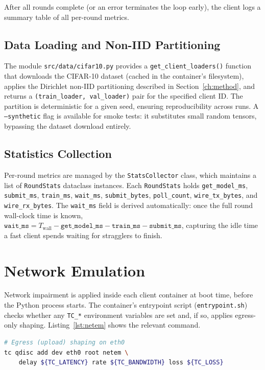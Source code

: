 \documentclass[12pt,a4paper]{report}
\begin{document}
After all rounds complete (or an error terminates the loop early), the
client logs a summary table of all per-round metrics.

\subsection{Data Loading and Non-IID Partitioning}

The module \texttt{src/data/cifar10.py} provides a
\texttt{get\_client\_loaders()} function that downloads the CIFAR-10
dataset (cached in the container's filesystem), applies the Dirichlet
non-IID partitioning described in Section~\ref{ch:method}, and returns a
\texttt{(train\_loader, val\_loader)} pair for the specified client ID.
The partition is deterministic for a given seed, ensuring reproducibility
across runs.  A \texttt{--synthetic} flag is available for smoke tests:
it substitutes small random tensors, bypassing the dataset download
entirely.

\subsection{Statistics Collection}

Per-round metrics are managed by the \texttt{StatsCollector} class,
which maintains a list of \texttt{RoundStats} dataclass instances.
Each \texttt{RoundStats} holds \texttt{get\_model\_ms},
\texttt{submit\_ms}, \texttt{train\_ms}, \texttt{wait\_ms},
\texttt{submit\_bytes}, \texttt{poll\_count}, \texttt{wire\_tx\_bytes},
and \texttt{wire\_rx\_bytes}.  The \texttt{wait\_ms} field is derived
automatically: once the full round wall-clock time is known,
$\texttt{wait\_ms} = T_{\mathrm{wall}} - \texttt{get\_model\_ms} -
\texttt{train\_ms} - \texttt{submit\_ms}$, capturing the idle time a
fast client spends waiting for stragglers to finish.

\section{Network Emulation}
\label{sec:netem}

Network impairment is applied inside each client container at boot time,
before the Python process starts.  The container's entrypoint script
(\texttt{entrypoint.sh}) checks whether any \texttt{TC\_*} environment
variables are set and, if so, applies egress-only shaping.
Listing~\ref{lst:netem} shows the relevant command.

\begin{lstlisting}[language=bash, caption={Network shaping command from
  \texttt{entrypoint.sh}.}, label=lst:netem]
# Egress (upload) shaping on eth0
tc qdisc add dev eth0 root netem \
    delay ${TC_LATENCY} rate ${TC_BANDWIDTH} loss ${TC_LOSS}
\end{lstlisting}
\end{document}
